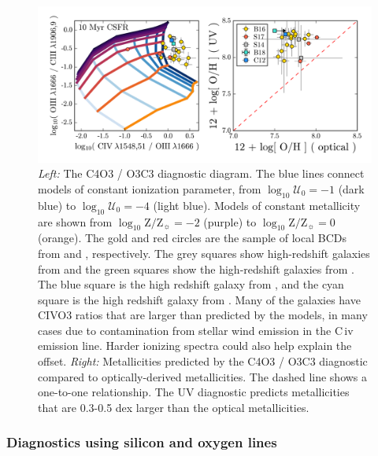 \documentclass[preprint2]{aastex62}
\newcommand{\civ}{C\,{\sc iv}\xspace}
\newcommand{\logten}{\ensuremath{\log_{10}}}
\newcommand{\logZeq}[1]{\ensuremath{\logten \mathrm{Z}/\mathrm{Z}_{\sun} = #1}}
\newcommand{\logUeq}[1]{\ensuremath{\logten \mathcal{U}_0 = #1}}
\begin{document}
\begin{figure}
  \begin{center}
    \includegraphics[width=\linewidth]{figs/af4.png}
    \caption{\emph{Left:} The C4O3 / O3C3 diagnostic diagram. The blue lines connect models of constant ionization parameter, from \logUeq{-1} (dark blue) to \logUeq{-4} (light blue). Models of constant metallicity are shown from \logZeq{-2} (purple) to \logZeq{0} (orange). The gold and red circles are the sample of local BCDs from \citet{Berg+2016} and \citet{Senchyna+2017}, respectively. The grey squares show high-redshift galaxies from \citet{Stark+2014} and the green squares show the high-redshift galaxies from \citet{Rigby+2018b}. The blue square is the high redshift galaxy from \citet{Christensen+2012}, and the cyan square is the high redshift galaxy from \citet{Berg+2018}. Many of the galaxies have CIVO3 ratios that are larger than predicted by the models, in many cases due to contamination from stellar wind emission in the \civ emission line. Harder ionizing spectra could also help explain the offset. \emph{Right:} Metallicities predicted by the C4O3 / O3C3 diagnostic compared to optically-derived metallicities. The dashed line shows a one-to-one relationship. The UV diagnostic predicts metallicities that are 0.3-0.5 dex larger than the optical metallicities.}
    \label{fig:UVCIV}
  \end{center}
\end{figure}

\subsubsection{Diagnostics using silicon and oxygen lines}\label{sec:UVOpt:SiO}
\end{document}
